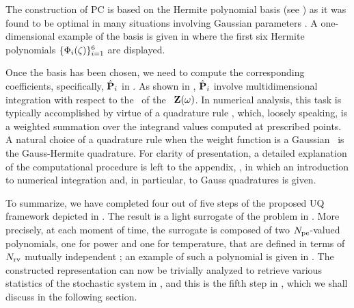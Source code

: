 
The construction of PC is based on the Hermite polynomial basis (see ) as it was found to be optimal in many situations involving Gaussian parameters \cite{xiu2002}. A one-dimensional example of the basis is given in  where the first six Hermite polynomials $\{ \Phi_i(\zeta) \}_{i = 1}^6$ are displayed.

Once the basis has been chosen, we need to compute the corresponding coefficients, specifically, $\hat{\mathbf{P}}_i$ in . As shown in , $\hat{\mathbf{P}}_i$ involve multidimensional integration with respect to the \pdf\ of the \rvs\ $\mathbf{Z}(\omega)$. In numerical analysis, this task is typically accomplished by virtue of a quadrature rule \cite{press2007}, which, loosely speaking, is a weighted summation over the integrand values computed at prescribed points. A natural choice of a quadrature rule when the weight function is a Gaussian \pdf\ is the Gauss-Hermite quadrature. For clarity of presentation, a detailed explanation of the computational procedure is left to the appendix, , in which an introduction to numerical integration and, in particular, to Gauss quadratures is given.

To summarize, we have completed four out of five steps of the proposed UQ framework depicted in . The result is a light surrogate of the problem in . More precisely, at each moment of time, the surrogate is composed of two ${N_\text{pe}}$-valued polynomials, one for power and one for temperature, that are defined in terms of ${N_\text{rv}}$ mutually independent \rvs; an example of such a polynomial is given in . The constructed representation can now be trivially analyzed to retrieve various statistics of the stochastic system in , and this is the fifth step in , which we shall discuss in the following section.
